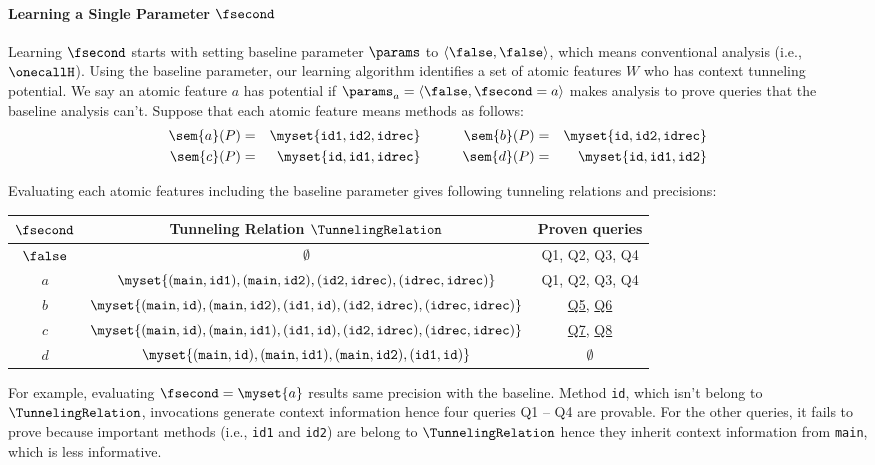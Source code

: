 \paragraph{Learning a Single Parameter $\fsecond$} Learning $\fsecond$ starts with setting baseline parameter $\params$ to $\langle \false, \false \rangle$, which means conventional analysis (i.e., $\onecallH$). Using the baseline parameter, our learning algorithm identifies a set of atomic features $W$ who has context tunneling potential. We say an atomic feature $a$ has potential if $\params_a=\langle \false, \fsecond=a \rangle$ makes analysis to prove queries that the baseline analysis can't. Suppose that each atomic feature means methods as follows:
\begin{equation} \label{eq:atoms}
\begin{aligned}
\sem{a}(P) & = & \myset{\texttt{id1}, \texttt{id2}, \texttt{idrec}} & \quad\quad & \sem{b}(P) & = & \myset{\texttt{id}, \texttt{id2}, \texttt{idrec}}\\
\sem{c}(P) & = & \myset{\texttt{id}, \texttt{id1}, \texttt{idrec}} & \quad\quad & \sem{d}(P) & = & \myset{\texttt{id}, \texttt{id1}, \texttt{id2}}
\end{aligned}
\end{equation}

Evaluating each atomic features including the baseline parameter gives following tunneling relations and precisions:
\begin{center}
\begin{tabular}{c|c|c}
  \hline
  $\fsecond$ & Tunneling Relation $\TunnelingRelation$ & Proven queries\\
  \hline \hline
  $\false$ & $\emptyset$ & Q1, Q2, Q3, Q4 \\
  $a$ & $\myset{({\tt main}, {\tt id1}), ({\tt main}, {\tt id2}), ({\tt id2}, {\tt idrec}), ({\tt idrec}, {\tt idrec})}$ & Q1, Q2, Q3, Q4 \\
  $b$ & $\myset{({\tt main}, {\tt id}), ({\tt main}, {\tt id2}), ({\tt id1}, {\tt id}), ({\tt id2}, {\tt idrec}), ({\tt idrec}, {\tt idrec})}$ & \underline{Q5}, \underline{Q6} \\
  $c$ & $\myset{({\tt main}, {\tt id}), ({\tt main}, {\tt id1}), ({\tt id1}, {\tt id}), ({\tt id2}, {\tt idrec}), ({\tt idrec}, {\tt idrec})}$ & \underline{Q7}, \underline{Q8} \\
  $d$ & $\myset{({\tt main}, {\tt id}), ({\tt main}, {\tt id1}), ({\tt main}, {\tt id2}), ({\tt id1}, {\tt id})}$ & $\emptyset$ \\
  \hline
\end{tabular}
\end{center}
For example, evaluating $\fsecond = \myset{a}$ results same precision with the baseline. Method {\tt id}, which isn't belong to $\TunnelingRelation$, invocations generate context information hence four queries Q1 -- Q4 are provable. For the other queries, it fails to prove because important methods (i.e., {\tt id1} and {\tt id2}) are belong to $\TunnelingRelation$ hence they inherit context information from {\tt main}, which is less informative.

